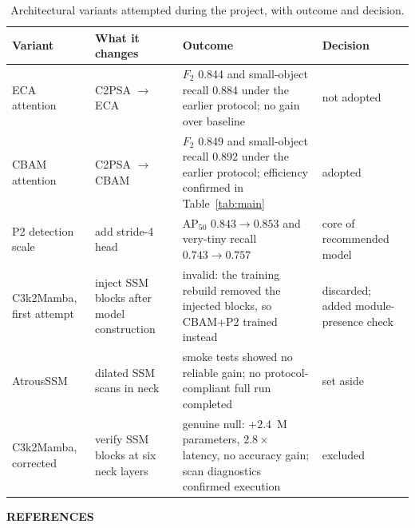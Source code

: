 \documentclass[12pt,a4paper,oneside]{report}
\begin{document}
\begin{table}[tbp]
  \centering
  \caption{Architectural variants attempted during the project, with outcome and decision.}
  \label{tab:apphistory}
  \small
  \setlength{\tabcolsep}{3pt}
  \begin{tabular}{@{}
    >{\raggedright\arraybackslash}p{2.4cm}
    >{\raggedright\arraybackslash}p{3.5cm}
    >{\raggedright\arraybackslash}p{5.1cm}
    >{\raggedright\arraybackslash}p{2.7cm}@{}}
    \toprule
    Variant & What it changes & Outcome & Decision \\
    \midrule
    ECA attention & C2PSA $\to$ ECA & $F_2$ 0.844 and small-object recall 0.884 under the earlier protocol; no gain over baseline & not adopted \\
    CBAM attention & C2PSA $\to$ CBAM & $F_2$ 0.849 and small-object recall 0.892 under the earlier protocol; efficiency confirmed in Table~\ref{tab:main} & adopted \\
    P2 detection scale & add stride-4 head & $\mathrm{AP}_{50}$ $0.843 \to 0.853$ and very-tiny recall $0.743 \to 0.757$ & core of recommended model \\
    C3k2Mamba, first attempt & inject SSM blocks after model construction & invalid: the training rebuild removed the injected blocks, so CBAM+P2 trained instead & discarded; added module-presence check \\
    AtrousSSM & dilated SSM scans in neck & smoke tests showed no reliable gain; no protocol-compliant full run completed & set aside \\
    C3k2Mamba, corrected & verify SSM blocks at six neck layers & genuine null: $+2.4$~M parameters, $2.8\times$ latency, no accuracy gain; scan diagnostics confirmed execution & excluded \\
    \bottomrule
  \end{tabular}
\end{table}

\clearpage
{}
{}
\begin{center}{\fontsize{14}{21}\selectfont\bfseries REFERENCES}\end{center}
\printbibliography[heading=none]
\end{document}
